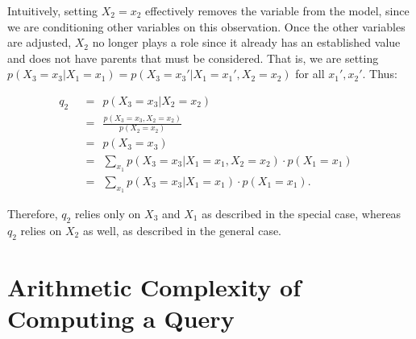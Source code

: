 \begin{example}
\null \quad \quad Intuitively, setting $X_{2}=x_{2}$ effectively removes the variable from the model, since we are conditioning other variables on this observation. Once the other variables are adjusted, $X_{2}$ no longer plays a role since it already has an established value and does not have parents that must be considered. That is, we are setting $p(X_{3}=x_{3}|X_{1}=x_{1}) = p(X_{3}=x_{3}'|X_{1}=x_{1}', X_{2}=x_{2})$ for all $x_{1}', x_{2}'$. Thus:

\begin{align*}
q_{2} & \ \ = \ \ p(X_{3}=x_{3}|X_{2}=x_{2}) & \\[1em]
& \ \ = \ \ \frac{p(X_{3}=x_{3}, X_{2}=x_{2})}{p(X_{2}=x_{2})} \\[1em]
& \ \ = \ \ p(X_{3}=x_{3})  \\[1em]
& \ \ = \ \ \sum_{x_{1}} p(X_{3}=x_{3}|X_{1}=x_{1},X_{2}=x_{2}) \cdot p(X_{1}=x_{1}) \\[1em]
& \ \ = \ \ \sum_{x_{1}} p(X_{3}=x_{3}|X_{1}=x_{1}) \cdot p(X_{1}=x_{1}). 
\end{align*}

Therefore, $q_{2}$ relies only on $X_{3}$ and $X_{1}$ as described in the special case, whereas $q_{2}$ relies on $X_{2}$ as well, as described in the general case. 


\end{example}

\section{Arithmetic Complexity of Computing a Query}\label{section:complexityofaquery}


